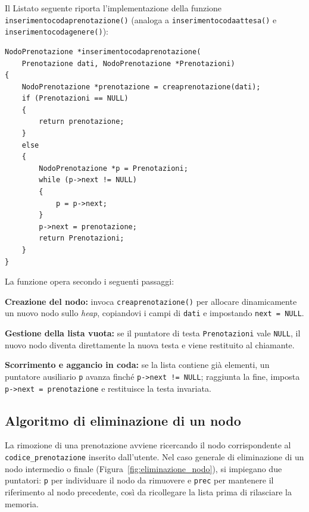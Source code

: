 \documentclass[11pt,a4paper,oneside,openany]{book}
\newenvironment{listacomp}{%
    \small
    \begin{list}{\textendash}{%
        \setlength{\topsep}{2pt}%
        \setlength{\partopsep}{0pt}%
        \setlength{\itemsep}{1pt}%
        \setlength{\parsep}{0pt}%
        \setlength{\leftmargin}{1.2em}%
    }%
}{%
    \end{list}%
}
\begin{document}
Il Listato seguente riporta l'implementazione della funzione \texttt{inserimentocodaprenotazione()} (analoga a \texttt{inserimentocodaattesa()} e \texttt{inserimentocodagenere()}):

\begin{lstlisting}[caption={Inserimento in coda nella lista delle prenotazioni}]
NodoPrenotazione *inserimentocodaprenotazione(
    Prenotazione dati, NodoPrenotazione *Prenotazioni)
{
    NodoPrenotazione *prenotazione = creaprenotazione(dati);
    if (Prenotazioni == NULL)
    {
        return prenotazione;
    }
    else
    {
        NodoPrenotazione *p = Prenotazioni;
        while (p->next != NULL)
        {
            p = p->next;
        }
        p->next = prenotazione;
        return Prenotazioni;
    }
}
\end{lstlisting}

La funzione opera secondo i seguenti passaggi:
\begin{listacomp}
    \item \textbf{Creazione del nodo:} invoca \texttt{creaprenotazione()} per allocare dinamicamente un nuovo nodo sullo \emph{heap}, copiandovi i campi di \texttt{dati} e impostando \texttt{next = NULL}.
    \item \textbf{Gestione della lista vuota:} se il puntatore di testa \texttt{Prenotazioni} vale \texttt{NULL}, il nuovo nodo diventa direttamente la nuova testa e viene restituito al chiamante.
    \item \textbf{Scorrimento e aggancio in coda:} se la lista contiene già elementi, un puntatore ausiliario \texttt{p} avanza finché \texttt{p->next != NULL}; raggiunta la fine, imposta \texttt{p->next = prenotazione} e restituisce la testa invariata.
\end{listacomp}

\subsection{Algoritmo di eliminazione di un nodo}
La rimozione di una prenotazione avviene ricercando il nodo corrispondente al \texttt{codice\_prenotazione} inserito dall'utente. Nel caso generale di eliminazione di un nodo intermedio o finale (Figura~\ref{fig:eliminazione_nodo}), si impiegano due puntatori: \texttt{p} per individuare il nodo da rimuovere e \texttt{prec} per mantenere il riferimento al nodo precedente, così da ricollegare la lista prima di rilasciare la memoria.
\end{document}
